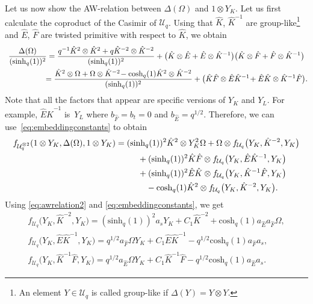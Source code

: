 \documentclass[pdftex]{sigma}
\numberwithin{equation}{section}
\newcommand{\chq}{\mathrm{cosh}_q}
\newcommand{\shq}{\mathrm{sinh}_q}
\newcommand{\Uq}{\mathcal{U}_q}
\begin{document}
Let us now show the AW-relation between $\Delta(\Omega)$ and $1\otimes Y_K$. Let us first calculate the coproduct of the Casimir of $\Uq$. Using that $\hat{K}$, $\hat{K}^{-1}$ are group-like\footnote{An element $Y\in\Uq$ is called group-like if $\Delta(Y)=Y\otimes Y$.} and ${\hat{E}}$, ${\hat{F}}$ are twisted primitive with respect to $\hat{K}$, we obtain
\begin{gather*}
\frac{\Delta(\Omega)}{(\shq(1))^2}=\frac{q^{-1} \hat{K}^2\otimes \hat{K}^2 +q \hat{K}^{-2}\otimes \hat{K}^{-2}}{(\shq(1))^2} + \big(\hat{K}\otimes {\hat{E}} + {\hat{E}}\otimes \hat{K}^{-1}\big)\big(\hat{K}\otimes {\hat{F}} + {\hat{F}}\otimes \hat{K}^{-1}\big)\nonumber\\
\hphantom{\frac{\Delta(\Omega)}{(\shq(1))^2}}{}
	=\frac{\hat{K}^2\otimes \Omega + \Omega\otimes \hat{K}^{-2}\! - \chq(1) \hat{K}^2\otimes \hat{K}^{-2}}{(\shq(1))^2} + \big(\hat{K}{\hat{F}}\otimes {\hat{E}}\hat{K}^{-1}\! + {\hat{E}}\hat{K}\otimes \hat{K}^{-1}{\hat{F}}\big).
\end{gather*}
Note that all the factors that appear are specific versions of $Y_K$ and $Y_L$. For example, ${\hat{E}}\hat{K}^{-1}$ is~$Y_L$ where $b_{\hat{F}}=b_t=0$ and $b_{\hat{E}}=q^{1/2}$. Therefore, we can use~\eqref{eq:embeddingconstants} to obtain
\begin{gather}
	f_{\Uq^{\otimes2}}(1\otimes Y_K,\Delta(\Omega),1\otimes Y_K)= (\shq(1))^2 \hat{K}^2\otimes Y_K^2\Omega + \Omega \otimes f_{\Uq}\big(Y_K,\hat{K}^{-2},Y_K\big)\nonumber \\
\hphantom{f_{\Uq^{\otimes2}}(1\otimes Y_K,\Delta(\Omega),1\otimes Y_K)=}{}
+ (\shq(1))^2\hat{K}{\hat{F}}\otimes f_{\Uq}\big(Y_K,{\hat{E}}\hat{K}^{-1},Y_K\big)\nonumber	\\
\hphantom{f_{\Uq^{\otimes2}}(1\otimes Y_K,\Delta(\Omega),1\otimes Y_K)=}{}
+(\shq(1))^2{\hat{E}}\hat{K}\otimes f_{\Uq}\big(Y_K,\hat{K}^{-1}{\hat{F}},Y_K\big)\nonumber \\
\hphantom{f_{\Uq^{\otimes2}}(1\otimes Y_K,\Delta(\Omega),1\otimes Y_K)=}{}
- \chq(1) \hat{K}^2\otimes f_{\Uq}\big(Y_K,\hat{K}^{-2},Y_K\big)\label{eq:k0coproductcasimir}.
\end{gather}
Using \eqref{eq:awrelation2} and \eqref{eq:embeddingconstants}, we get
\begin{gather*}
	f_{\Uq}\big(Y_K,\hat{K}^{-2},Y_K\big) = (\shq(1))^2 a_s Y_K + C_1\hat{K}^{-2} + \chq(1)a_{\hat{E}}a_{\hat{F}}\Omega,\\
	f_{\Uq}\big(Y_K,{\hat{E}}\hat{K}^{-1},Y_K\big) = q^{1/2}a_{\hat{F}}\Omega Y_K + C_1 {\hat{E}}\hat{K}^{-1} - q^{1/2}\chq(1)a_{\hat{F}}a_s,\\
	f_{\Uq}\big(Y_K,\hat{K}^{-1}{\hat{F}},Y_K\big) = q^{1/2}a_{\hat{E}}\Omega Y_K + C_1 \hat{K}^{-1}{\hat{F}} - q^{1/2}\chq(1)a_{\hat{E}}a_s.
\end{gather*}
\end{document}
